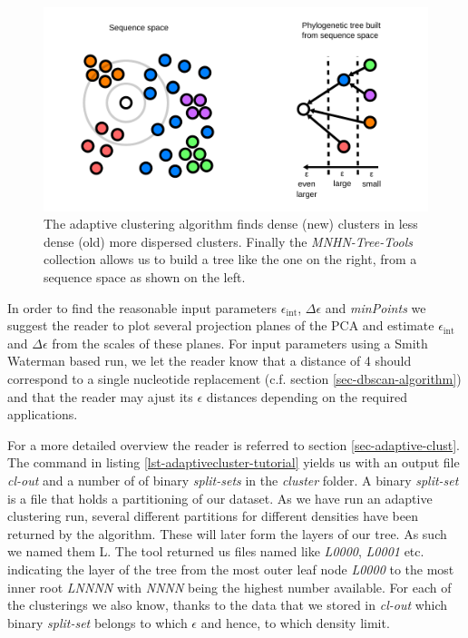 \begin{figure}
  \includegraphics{densities-space.pdf}
  \caption{The adaptive clustering algorithm finds dense (new)
    clusters in less dense (old) more dispersed clusters. Finally the
    \emph{MNHN-Tree-Tools} collection allows us to build a tree like
    the one on the right, from a sequence space as shown on the
    left.}
  \label{fig-adaptive-cluster}
\end{figure}

In order to find the reasonable input parameters
$\epsilon_{\mathrm{int}}$, $\Delta\epsilon$ and \emph{minPoints} we
suggest the reader to plot several projection planes of the PCA and
estimate $\epsilon_{\mathrm{int}}$ and $\Delta\epsilon$ from the
scales of these planes. For input parameters using a Smith Waterman
based run, we let the reader know that a distance of 4 should
correspond to a single nucleotide replacement (c.f. section
\ref{sec-dbscan-algorithm}) and that the reader may
ajust its $\epsilon$ distances depending on the required
applications. 

For a more detailed overview the reader is referred to section
\ref{sec-adaptive-clust}. The command in listing
\ref{lst-adaptivecluster-tutorial} yields us 
with an output file \emph{cl-out} and a number of of binary
\emph{split-sets} in the
\emph{cluster} folder. A binary \emph{split-set} is a file that holds
a partitioning of our dataset. As we have run an adaptive clustering
run, several different partitions for different densities have been
returned by the algorithm. These will later form the layers of our
tree. As such we named them L. The tool returned us files named like
\emph{L0000}, \emph{L0001} etc. indicating the layer of
the tree from the most outer leaf node \emph{L0000} to the most inner
root \emph{LNNNN} with \emph{NNNN} being the highest number
available. For each of the clusterings we also know, thanks to the
data that we stored in \emph{cl-out} which binary \emph{split-set}
belongs to which $\epsilon$ and hence, to which density limit.

